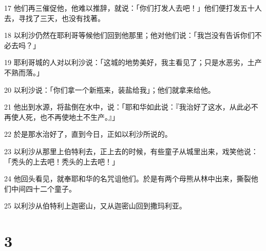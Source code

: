 \par 17 他们再三催促他，他难以推辞，就说：「你们打发人去吧！」他们便打发五十人去，寻找了三天，也没有找著。
\par 18 以利沙仍然在耶利哥等候他们回到他那里；他对他们说：「我岂没有告诉你们不必去吗？」
\par 19 耶利哥城的人对以利沙说：「这城的地势美好，我主看见了；只是水恶劣，土产不熟而落。」
\par 20 以利沙说：「你们拿一个新瓶来，装盐给我」；他们就拿来给他。
\par 21 他出到水源，将盐倒在水中，说：「耶和华如此说：『我治好了这水，从此必不再使人死，也不再使地土不生产。』」
\par 22 於是那水治好了，直到今日，正如以利沙所说的。
\par 23 以利沙从那里上伯特利去，正上去的时候，有些童子从城里出来，戏笑他说：「秃头的上去吧！秃头的上去吧！」
\par 24 他回头看见，就奉耶和华的名咒诅他们。於是有两个母熊从林中出来，撕裂他们中间四十二个童子。
\par 25 以利沙从伯特利上迦密山，又从迦密山回到撒玛利亚。

\chapter{3}

